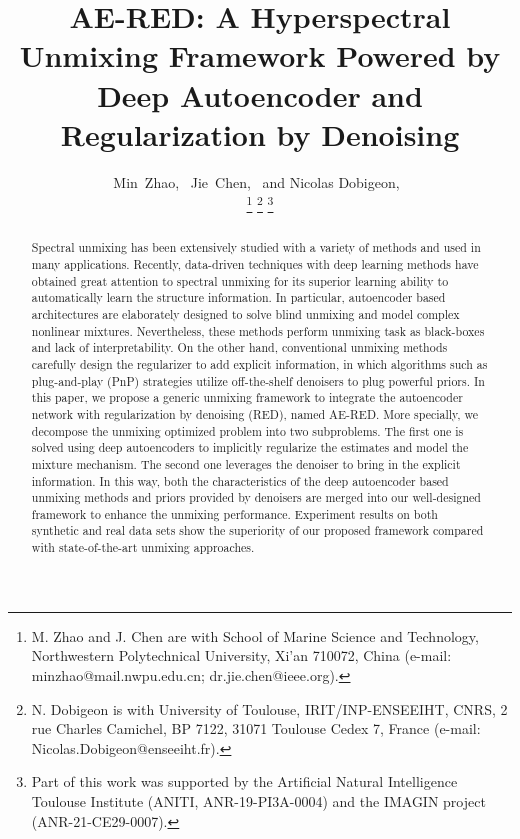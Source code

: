 \documentclass[journal,a4paper]{IEEEtran}
\begin{document}
\title{AE-RED: A Hyperspectral Unmixing Framework Powered by Deep Autoencoder and Regularization by Denoising}

\author{Min~Zhao,~
        Jie~Chen,~
       and Nicolas Dobigeon,~


\thanks{M. Zhao and J. Chen are with School of Marine Science and Technology,
Northwestern Polytechnical University, Xi'an 710072, China (e-mail:
minzhao@mail.nwpu.edu.cn; dr.jie.chen@ieee.org).}
\thanks{N. Dobigeon is with University of Toulouse, IRIT/INP-ENSEEIHT,
CNRS, 2 rue Charles Camichel, BP 7122, 31071 Toulouse Cedex 7, France (e-mail: Nicolas.Dobigeon@enseeiht.fr).}
\thanks{Part of this work was supported by the Artificial Natural Intelligence Toulouse Institute (ANITI, ANR-19-PI3A-0004) and the IMAGIN project (ANR-21-CE29-0007).}}
\maketitle
\begin{abstract}
Spectral unmixing has been extensively studied with a variety of methods and used in many applications.  Recently, data-driven techniques with deep learning methods have obtained great attention to spectral unmixing for its superior learning ability to automatically learn the structure information. In particular, autoencoder based architectures are elaborately designed to solve blind unmixing and model complex nonlinear mixtures. Nevertheless, these methods perform unmixing task as black-boxes and lack of interpretability. On the other hand, conventional unmixing methods carefully design the regularizer to add explicit information, in which algorithms such as plug-and-play (PnP) strategies utilize off-the-shelf denoisers to plug powerful priors. In this paper, we propose a generic unmixing framework to integrate the autoencoder network with regularization by denoising (RED), named AE-RED.
More specially, we decompose the unmixing optimized problem into two subproblems. The first one is solved using deep autoencoders to implicitly regularize the estimates and model the mixture mechanism. The second one leverages the denoiser to bring in the explicit information. 
In this way, both the characteristics of the deep autoencoder based unmixing methods and priors provided by denoisers are merged into our well-designed framework to enhance the unmixing performance. Experiment results on both synthetic and real data sets show the superiority of our proposed framework compared with state-of-the-art unmixing approaches.
\end{abstract}
\end{document}
